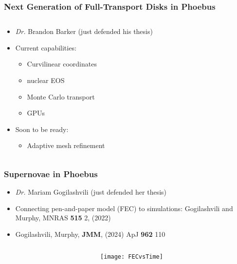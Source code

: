 \documentclass[]{beamer}
\begin{document}
\begin{frame}
  \frametitle{Next Generation of Full-Transport Disks in Phoebus}
  \begin{columns}
    \begin{column}{6cm}
      \begin{itemize}
      \item \textit{Dr.} Brandon Barker (just defended his thesis)
      \item Current capabilities:
        \begin{itemize}
        \item Curvilinear coordinates
        \item nuclear EOS
        \item Monte Carlo transport
        \item GPUs
        \end{itemize}
      \item Soon to be ready:
        \begin{itemize}
        \item Adaptive mesh refinement
        \end{itemize}
      \end{itemize}
    \end{column}
    \begin{column}{6cm}
      \begin{center}
      \end{center}
    \end{column}
  \end{columns}
\end{frame}

\begin{frame}
  \frametitle{Supernovae in Phoebus}
  \begin{itemize}
  \item \textit{Dr.} Mariam Gogilashvili (just defended her thesis)
  \item Connecting pen-and-paper model (FEC) to simulations: Gogilashvili and Murphy, MNRAS \textbf{515} 2, (2022)
  \item Gogilashvili, Murphy, \textbf{JMM}, (2024) ApJ \textbf{962} 110
  \end{itemize}
  \begin{columns}
    \begin{column}{6cm}
      \begin{center}
      \end{center}
    \end{column}
    \begin{column}{6cm}
      \begin{center}
        \texttt{[image: FECvsTime]}
      \end{center}
    \end{column}
  \end{columns}
\end{frame}
\end{document}
